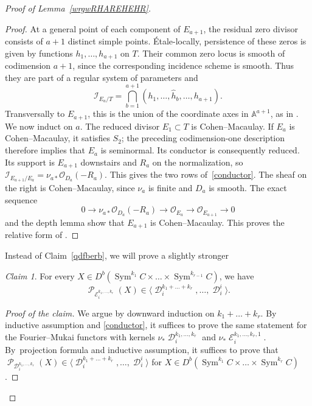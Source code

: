 \documentclass[11pt,letterpaper]{amsart}
\theoremstyle{plain}
\theoremstyle{definition}
\theoremstyle{remark}
\newtheorem{claim}[theorem]{Claim}
\numberwithin{equation}{section}
\DeclareMathOperator{\Sym}{Sym}
\DeclareMathOperator{\cD}{\mathcal{D}}
\DeclareMathOperator{\cE}{\mathcal{E}}
\DeclareMathOperator{\cP}{\mathcal{P}}
\begin{document}
\begin{proof}[Proof of Lemma~\ref{wrgwRHAREHEHR}]
\begin{proof}
At a general point of each component of $E_{a+1}$, the residual
zero divisor consists of $a+1$ distinct simple points.
\'Etale-locally, persistence of these zeros is given by functions
$h_1,\ldots,h_{a+1}$ on $T$. Their common zero locus is smooth of
codimension $a+1$, since the corresponding incidence scheme is
smooth. Thus they are part of a regular system of parameters and
\[
 \mathcal I_{E_a/T}
 =\bigcap_{b=1}^{a+1}
   (h_1,\ldots,\widehat h_b,\ldots,h_{a+1}).
\]
Transversally to $E_{a+1}$, this is the union of the coordinate
axes in $\mathbb A^{a+1}$, as in \cite[Claim~6.6]{TT}.
We now induct on $a$. The reduced divisor $E_1\subset T$ is
Cohen--Macaulay. If $E_a$ is Cohen--Macaulay, it satisfies $S_2$;
the preceding codimension-one description therefore implies that
$E_a$ is seminormal. Its conductor is consequently reduced.
Its support is $E_{a+1}$ downstairs and $R_a$ on the normalization,
so
$
 \mathcal I_{E_{a+1}/E_a}
 =\nu_{a*}\mathcal O_{D_a}(-R_a)$.
This gives the two rows of~\eqref{conductor}. The sheaf on the right
is Cohen--Macaulay, since $\nu_a$ is finite and $D_a$ is smooth.
The exact sequence
\[
 0\longrightarrow\nu_{a*}\mathcal O_{D_a}(-R_a)
 \longrightarrow\mathcal O_{E_a}
 \longrightarrow\mathcal O_{E_{a+1}}\longrightarrow0
\]
and the depth lemma show that $E_{a+1}$ is Cohen--Macaulay.
This proves the relative form of \cite[Lemma~6.5]{TT}.
\end{proof}


Instead of  Claim~\ref{qdfberb}, we will prove a slightly stronger 
\begin{claim}
For every  $X\in D^b(\Sym^{k_1}C\times\ldots\times \Sym^{k_{r-1}}C)$, we have
$$\cP_{\cE_i^{k_1,\ldots,k_r}}(X)\in\langle\cD_i^{k_1+\ldots+k_r},\ldots,\cD_i^i\rangle.$$
\end{claim}

\begin{proof}[Proof of the claim]
We argue by  downward induction on $k_1+\ldots+k_r$.
By inductive assumption and \eqref{conductor}, it suffices to prove the same statement for 
the Fourier--Mukai functors with kernels
$\nu_*\cD_i^{k_1,\ldots,k_r}$ and $\nu_*\cE_i^{k_1,\ldots,k_r,1}$.
By~projection formula and inductive assumption, it suffices to prove that 
$\cP_{\cD_i^{k_1,\ldots,k_r}}(X)\in\langle\cD_i^{k_1+\ldots+k_r},\ldots,\cD_i^i\rangle$
for  $X\in D^b(\Sym^{k_1}C\times\ldots\times \Sym^{k_{r}}C)$.


\end{proof}
\end{proof}
\end{document}
